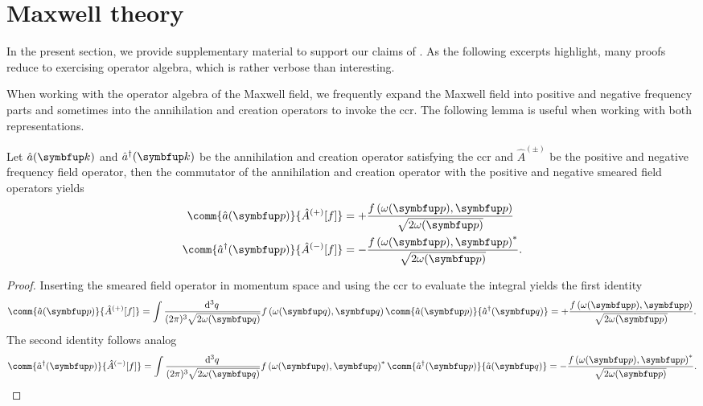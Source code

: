 \chapter{Maxwell theory}

In the present section, we provide supplementary material to support our claims of .
As the following excerpts highlight, many proofs reduce to exercising operator algebra, which is rather verbose than interesting.

When working with the operator algebra of the Maxwell field, we frequently expand the Maxwell field into positive and negative frequency parts and sometimes into the annihilation and creation operators to invoke the \gls{ccr}.
The following lemma is useful when working with both representations.
\begin{lemma}\label{th:annihilation_field_commutators}
	Let $\hat{a}(\vb{k})$ and $\hat{a}^\dagger(\vb{k})$ be the annihilation and creation operator satisfying the \gls{ccr} and $\hat{A}^{(\pm)}$ be the positive and negative frequency field operator, then the commutator of the annihilation and creation operator with the positive and negative smeared field operators yields
	\begin{align}
		\comm{\hat{a}(\vb{p})}{\hat{A}^{(+)}[f]}
		&=
		+\frac{f\left(\omega(\vb{p}),\vb{p}\right)}{\sqrt{2\omega(\vb{p})}}
		\\
		\comm{\hat{a}^\dagger(\vb{p})}{\hat{A}^{(-)}[f]}
		&=
		-\frac{f\left(\omega(\vb{p}),\vb{p}\right)^*}{\sqrt{2\omega(\vb{p})}}
		.
	\end{align}
\end{lemma}
\begin{proof}
	Inserting the smeared field operator in momentum space and using the \gls{ccr} to evaluate the integral yields the first identity
	\begin{equation}
		\comm{\hat{a}(\vb{p})}{\hat{A}^{(+)}[f]}
		=
		\int\frac{\dd[3]{q}}{(2\pi)^3\sqrt{2\omega(\vb{q})}}
		f\left(\omega(\vb{q}),\vb{q}\right)
		\comm{\hat{a}(\vb{p})}{\hat{a}^\dagger(\vb{q})}
		=
		+\frac{f\left(\omega(\vb{p}),\vb{p}\right)}{\sqrt{2\omega(\vb{p})}}
		.
	\end{equation}
	The second identity follows analog
	\begin{equation}
		\comm{\hat{a}^\dagger(\vb{p})}{\hat{A}^{(-)}[f]}
		=
		\int\frac{\dd[3]{q}}{(2\pi)^3\sqrt{2\omega(\vb{q})}}
		f\left(\omega(\vb{q}),\vb{q}\right)^*
		\comm{\hat{a}^\dagger(\vb{p})}{\hat{a}(\vb{q})}
		=
		-\frac{f\left(\omega(\vb{p}),\vb{p}\right)^*}{\sqrt{2\omega(\vb{p})}}
		.
	\end{equation}
\end{proof}
